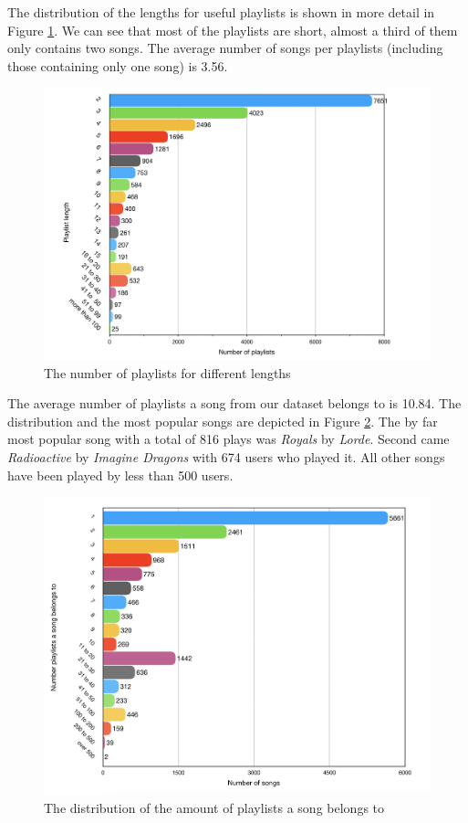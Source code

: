 The distribution of the lengths for useful playlists is shown in more detail in Figure
\ref{fig:playlist_length_distribution}. We can see that most of the playlists are
short, almost a third of them only contains two songs. The average number of songs
per playlists (including those containing only one song) is 3.56. 
\begin{figure}[ht]
    \centering
	\includegraphics[width=1\linewidth]{./img/playlist_length_numbers.png}
	\caption{The number of playlists for different lengths }
	\label{fig:playlist_length_distribution}
\end{figure}

The average number of playlists a song from our dataset belongs to is 10.84. The
distribution and the most popular songs are depicted in Figure
\ref{fig:popular_song_distribution}. The by far most popular song with a total of 816
plays was \textit{Royals} by \textit{Lorde}. Second came \textit{Radioactive} by
\textit{Imagine Dragons} with 674 users who played it. All other songs have been
played by less than 500 users.

\begin{figure}[ht]
    \centering
	\includegraphics[width=0.8\linewidth]{./img/times_played_numbers2.png}
	\caption{The distribution of the amount of playlists a song belongs to }
	\label{fig:popular_song_distribution}
\end{figure}
